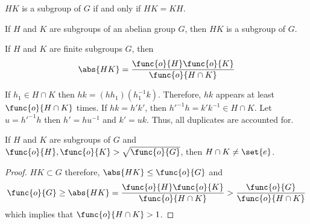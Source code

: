 \begin{lemma}
    \(HK\) is a subgroup of \(G\) if and only if \(HK = KH\).
\end{lemma}
\begin{corollary}
    If \(H\) and \(K\) are subgroups of an abelian group \(G\), then \(HK\) is a subgroup of \(G\).
\end{corollary}

\begin{lemma}
    If \(H\) and \(K\) are finite subgroups \(G\), then 
    \begin{equation*}
        \abs{HK} = \dfrac{\func{o}{H} \func{o}{K}}{\func{o}{H \cap K}}
    \end{equation*}
\end{lemma}

\begin{prooflemma}
    If \(h_1 \in H \cap K\) then \(hk = (hh_1)(h_1^{-1}k)\). Therefore, \(hk\) appears at least \(\func{o}{H \cap K}\) times. If \(hk = h'k'\), then \(h'^{-1}h = k' k^{-1} \in H \cap K\). Let \(u = h'^{-1}h\) then \(h' = hu^{-1}\) and \(k' = uk\). Thus, all duplicates are accounted for.
\end{prooflemma}

\begin{corollary}
    If \(H\) and \(K\) are subgroups of \(G\) and \(\func{o}{H},\func{o}{K} > \sqrt{\func{o}{G}}\), then \(H \cap K \neq \set{e}\).
\end{corollary}

\begin{proof}
    \(HK \subset G\) therefore, \(\abs{HK} \leq \func{o}{G}\) and 
    \begin{equation*}
        \func{o}{G} \geq \abs{HK}  = \dfrac{\func{o}{H} \func{o}{K}}{\func{o}{H \cap K}} > \dfrac{\func{o}{G}}{\func{o}{H \cap K}} 
    \end{equation*}
    which implies that \(\func{o}{H \cap K} > 1\).
\end{proof}